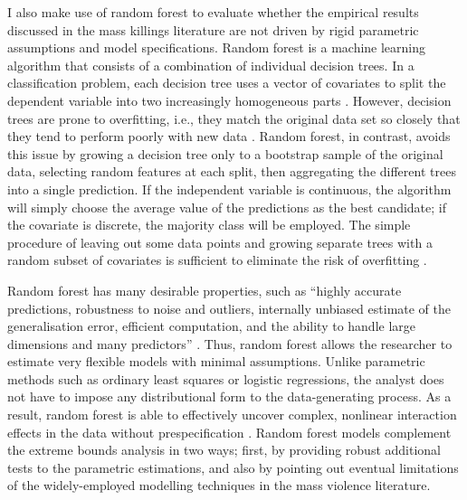 \documentclass[a4paper,12pt]{article}
\begin{document}
I also make use of random forest \citep{breiman2001random} to evaluate whether the empirical results discussed in the mass killings literature are not driven by rigid parametric assumptions and model specifications. Random forest is a machine learning algorithm that consists of a combination of individual decision trees. In a classification problem, each decision tree uses a vector of covariates to split the dependent variable into two increasingly homogeneous parts \citep{breiman2001statistical}. However, decision trees are prone to overfitting, i.e., they match the original data set so closely that they tend to perform poorly with new data \citep{dietterich1995comparison,ho1998random}. Random forest, in contrast, avoids this issue by growing a decision tree only to a bootstrap sample of the original data, selecting random features at each split, then aggregating the different trees into a single prediction. If the independent variable is continuous, the algorithm will simply choose the average value of the predictions as the best candidate; if the covariate is discrete, the majority class will be employed. The simple procedure of leaving out some data points and growing separate trees with a random subset of covariates is sufficient to eliminate the risk of overfitting \citep[9-10]{jones2015exploratory}.
	
Random forest has many desirable properties, such as ``highly accurate predictions, robustness to noise and outliers, internally unbiased estimate of the generalisation error, efficient computation, and the ability to handle large dimensions and many predictors'' \citep[7]{muchlinski2015comparing}. Thus, random forest allows the researcher to estimate very flexible models with minimal assumptions. Unlike parametric methods such as ordinary least squares or logistic regressions, the analyst does not have to impose any distributional form to the data-generating process. As a result, random forest is able to effectively uncover complex, nonlinear interaction effects in the data without prespecification \citep{jones2015exploratory,jones2018there}. Random forest models complement the extreme bounds analysis in two ways; first, by providing robust additional tests to the parametric estimations, and also by pointing out eventual limitations of the widely-employed modelling techniques in the mass violence literature. 
	
\end{document}
